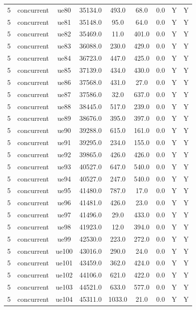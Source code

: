\begin{table}[ht]
\begin{tabular}{|c|c|c|c|c|c|c|c|c|}
5 & concurrent & ue80 & 35134.0 & 493.0 & 68.0 & 0.0 & Y & Y \\
5 & concurrent & ue81 & 35148.0 & 95.0 & 64.0 & 0.0 & Y & Y \\
5 & concurrent & ue82 & 35469.0 & 11.0 & 401.0 & 0.0 & Y & Y \\
5 & concurrent & ue83 & 36088.0 & 230.0 & 429.0 & 0.0 & Y & Y \\
5 & concurrent & ue84 & 36723.0 & 447.0 & 425.0 & 0.0 & Y & Y \\
5 & concurrent & ue85 & 37139.0 & 434.0 & 430.0 & 0.0 & Y & Y \\
5 & concurrent & ue86 & 37568.0 & 431.0 & 27.0 & 0.0 & Y & Y \\
5 & concurrent & ue87 & 37586.0 & 32.0 & 637.0 & 0.0 & Y & Y \\
5 & concurrent & ue88 & 38445.0 & 517.0 & 239.0 & 0.0 & Y & Y \\
5 & concurrent & ue89 & 38676.0 & 395.0 & 397.0 & 0.0 & Y & Y \\
5 & concurrent & ue90 & 39288.0 & 615.0 & 161.0 & 0.0 & Y & Y \\
5 & concurrent & ue91 & 39295.0 & 234.0 & 155.0 & 0.0 & Y & Y \\
5 & concurrent & ue92 & 39865.0 & 426.0 & 426.0 & 0.0 & Y & Y \\
5 & concurrent & ue93 & 40527.0 & 647.0 & 540.0 & 0.0 & Y & Y \\
5 & concurrent & ue94 & 40527.0 & 247.0 & 540.0 & 0.0 & Y & Y \\
5 & concurrent & ue95 & 41480.0 & 787.0 & 17.0 & 0.0 & Y & Y \\
5 & concurrent & ue96 & 41481.0 & 426.0 & 23.0 & 0.0 & Y & Y \\
5 & concurrent & ue97 & 41496.0 & 29.0 & 433.0 & 0.0 & Y & Y \\
5 & concurrent & ue98 & 41923.0 & 12.0 & 394.0 & 0.0 & Y & Y \\
5 & concurrent & ue99 & 42530.0 & 223.0 & 272.0 & 0.0 & Y & Y \\
5 & concurrent & ue100 & 43016.0 & 290.0 & 24.0 & 0.0 & Y & Y \\
5 & concurrent & ue101 & 43459.0 & 362.0 & 424.0 & 0.0 & Y & Y \\
5 & concurrent & ue102 & 44106.0 & 621.0 & 422.0 & 0.0 & Y & Y \\
5 & concurrent & ue103 & 44521.0 & 633.0 & 577.0 & 0.0 & Y & Y \\
5 & concurrent & ue104 & 45311.0 & 1033.0 & 21.0 & 0.0 & Y & Y \\

\end{tabular}
\end{table}
